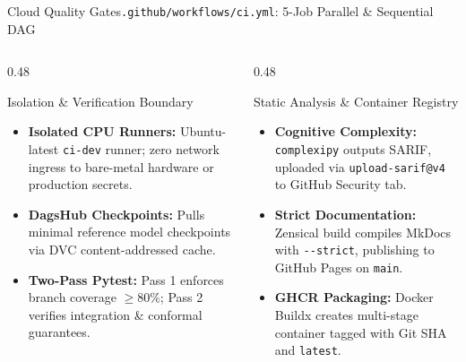 \begin{frame}[fragile]{Cloud Quality Gates}{\texttt{.github/workflows/ci.yml}: 5-Job Parallel \& Sequential DAG}
{
    }

    \vspace{-0.40cm}

    \begin{columns}[T]
        \begin{column}{0.48\textwidth}
            \begin{block}{Isolation \& Verification Boundary}
                \begin{itemize}\tiny
                    \item \textbf{Isolated CPU Runners:} Ubuntu-latest \texttt{ci-dev} runner; zero network ingress to bare-metal hardware or production secrets.
                    \item \textbf{DagsHub Checkpoints:} Pulls minimal reference model checkpoints via DVC content-addressed cache.
                    \item \textbf{Two-Pass Pytest:} Pass 1 enforces branch coverage $\ge 80\%$; Pass 2 verifies integration \& conformal guarantees.
                \end{itemize}
            \end{block}
        \end{column}
        \begin{column}{0.48\textwidth}
            \begin{block}{Static Analysis \& Container Registry}
                \begin{itemize}\tiny
                    \item \textbf{Cognitive Complexity:} \texttt{complexipy} outputs SARIF, uploaded via \texttt{upload-sarif@v4} to GitHub Security tab.
                    \item \textbf{Strict Documentation:} Zensical build compiles MkDocs with \texttt{-{}-strict}, publishing to GitHub Pages on \texttt{main}.
                    \item \textbf{GHCR Packaging:} Docker Buildx creates multi-stage container tagged with Git SHA and \texttt{latest}.
                \end{itemize}
            \end{block}
        \end{column}
    \end{columns}


\end{frame}
